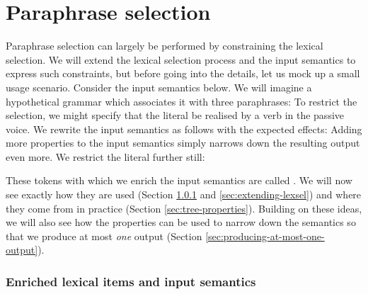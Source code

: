 \chapter{Paraphrase selection}
\label{cha:paraphrase}

Paraphrase selection can largely be performed by constraining the
lexical selection.  We will extend the lexical selection process and the
input semantics to express such
constraints, but before going into the details, let us mock up a small
usage scenario.  Consider the input semantics below.  We will imagine a
hypothetical grammar which associates it with three paraphrases:
To restrict the selection, we might specify that the literal
 be realised by a verb in the passive voice.
We rewrite the input semantics as follows with the expected effects:
Adding more properties to the input semantics simply narrows down the
resulting output even more.  We restrict the literal further still:

These tokens with which we enrich the input semantics are called
.  We will now see exactly how they are
used (Section \ref{sec:enriched-stuff} and \ref{sec:extending-lexsel})
and where they come from in practice (Section
\ref{sec:tree-properties}).  Building on these ideas, we will also see
how the properties can be used to narrow down the semantics so that we
produce at most \emph{one} output (Section
\ref{sec:producing-at-most-one-output}).

\subsection{Enriched lexical items and input semantics}
\label{sec:enriched-stuff}

